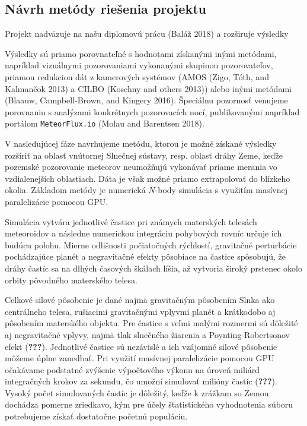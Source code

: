 \subsection{Návrh metódy riešenia
projektu}\label{nuxe1vrh-metuxf3dy-rieux161enia-projektu}

Projekt nadväzuje na našu diplomovú prácu (Baláž 2018) a rozširuje
výsledky

Výsledky sú priamo porovnateľné s hodnotami získanými inými metódami,
napríklad vizuálnymi pozorovaniami vykonanými skupinou pozorovateľov,
priamou redukciou dát z kamerových systémov (AMOS (Zigo, Tóth, and
Kalmančok 2013) a CILBO (Koschny and others 2013)) alebo inými metódami
(Blaauw, Campbell-Brown, and Kingery 2016). Špeciálnu pozornosť venujeme
porovnaniu s analýzami konkrétnych pozorovacích nocí, publikovanými
napríklad portálom \texttt{MeteorFlux.io} (Molau and Barentsen 2018).

V nasledujúcej fáze navrhujeme metódu, ktorou je možné získané výsledky
rozšíriť na oblasť vnútornej Slnečnej sústavy, resp. oblasť dráhy Zeme,
keďže pozemské pozorovanie meteorov neumožňujú vykonávať priame merania
vo vzdialenejších oblastiach. Dáta je však možné priamo extrapolovať do
blízkeho okolia. Základom metódy je numerická \(N\)-body simulácia s
využitím masívnej paralelizácie pomocou GPU.

Simulácia vytvára jednotlivé častice pri známych materských telesách
meteoroidov a následne numerickou integráciu pohybových rovníc určuje
ich budúcu polohu. Mierne odlišnosti počiatočných rýchlostí, gravitačné
perturbácie pochádzajúce planét a negravitačné efekty pôsobiace na
častice spôsobujú, že dráhy častíc sa na dlhých časových škálach líšia,
až vytvoria široký prstenec okolo orbity pôvodného materského telesa.

Celkové silové pôsobenie je dané najmä gravitačným pôsobením Slnka ako
centrálneho telesa, rušiacimi gravitačnými vplyvmi planét a krátkodobo
aj pôsobením materského objektu. Pre častice s veľmi malými rozmermi sú
dôležité aj negravitačné vplyvy, najmä tlak slnečného žiarenia a
Poynting-Robertsonov efekt ({\textbf{???}}). Jednotlivé častice sú
nezávislé a ich vzájomné silové pôsobenie môžeme úplne zanedbať. Pri
využití masívnej paralelizácie pomocou GPU očakávame podstatné zvýšenie
výpočtového výkonu na úroveň miliárd integračných krokov za sekundu, čo
umožní simulovať milióny častíc ({\textbf{???}}). Vysoký počet
simulovaných častíc je dôležitý, keďže k zrážkam so Zemou dochádza
pomerne zriedkavo, kým pre účely štatistického vyhodnotenia súboru
potrebujeme získať dostatočne početnú populáciu.

